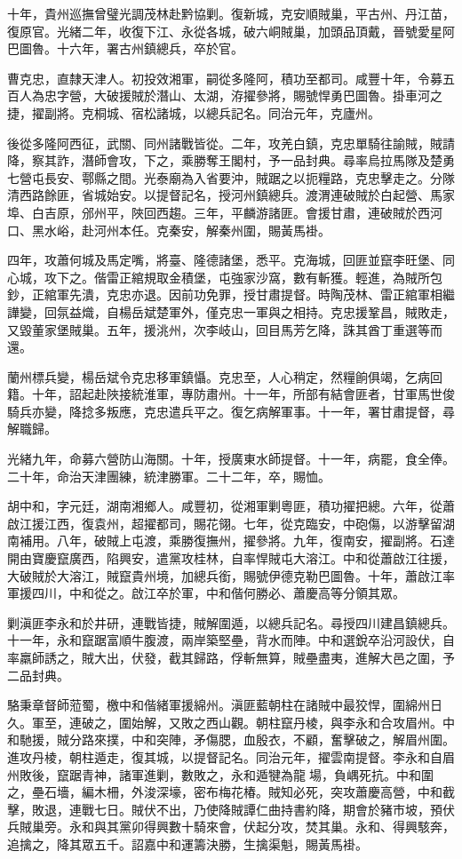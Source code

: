 \begin{pinyinscope}
十年，貴州巡撫曾璧光調茂林赴黔協剿。復新城，克安順賊巢，平古州、丹江苗，復原官。光緒二年，收復下江、永從各城，破六峒賊巢，加頭品頂戴，晉號愛星阿巴圖魯。十六年，署古州鎮總兵，卒於官。

曹克忠，直隸天津人。初投效湘軍，嗣從多隆阿，積功至都司。咸豐十年，令募五百人為忠字營，大破援賊於潛山、太湖，洊擢參將，賜號悍勇巴圖魯。掛車河之捷，擢副將。克桐城、宿松諸城，以總兵記名。同治元年，克廬州。

後從多隆阿西征，武關、同州諸戰皆從。二年，攻羌白鎮，克忠單騎往諭賊，賊請降，察其詐，潛師會攻，下之，乘勝奪王閣村，予一品封典。尋率烏拉馬隊及楚勇七營屯長安、鄠縣之間。光泰廟為入省要沖，賊踞之以扼糧路，克忠擊走之。分隊清西路餘匪，省城始安。以提督記名，授河州鎮總兵。渡渭連破賊於白起營、馬家埠、白吉原，邠州平，陜回西趨。三年，平麟游諸匪。會援甘肅，連破賊於西河口、黑水峪，赴河州本任。克秦安，解秦州圍，賜黃馬褂。

四年，攻蕭何城及馬定嘴，將臺、隆德諸堡，悉平。克海城，回匪並竄李旺堡、同心城，攻下之。偕雷正綰規取金積堡，屯強家沙窩，數有斬獲。輕進，為賊所包鈔，正綰軍先潰，克忠亦退。因前功免罪，授甘肅提督。時陶茂林、雷正綰軍相繼譁變，回氛益熾，自楊岳斌楚軍外，僅克忠一軍與之相持。克忠援鞏昌，賊敗走，又毀董家堡賊巢。五年，援洮州，次李岐山，回目馬芳乞降，誅其酋丁重選等而還。

蘭州標兵變，楊岳斌令克忠移軍鎮懾。克忠至，人心稍定，然糧餉俱竭，乞病回籍。十年，詔起赴陜接統淮軍，專防肅州。十一年，所部有結會匪者，甘軍馬世俊騎兵亦變，降捻多叛應，克忠遣兵平之。復乞病解軍事。十一年，署甘肅提督，尋解職歸。

光緒九年，命募六營防山海關。十年，授廣東水師提督。十一年，病罷，食全俸。二十年，命治天津團練，統津勝軍。二十二年，卒，賜恤。

胡中和，字元廷，湖南湘鄉人。咸豐初，從湘軍剿粵匪，積功擢把總。六年，從蕭啟江援江西，復袁州，超擢都司，賜花翎。七年，從克臨安，中砲傷，以游擊留湖南補用。八年，破賊上屯渡，乘勝復撫州，擢參將。九年，復南安，擢副將。石達開由寶慶竄廣西，陷興安，遣黨攻桂林，自率悍賊屯大溶江。中和從蕭啟江往援，大破賊於大溶江，賊竄貴州境，加總兵銜，賜號伊德克勒巴圖魯。十年，蕭啟江率軍援四川，中和從之。啟江卒於軍，中和偕何勝必、蕭慶高等分領其眾。

剿滇匪李永和於井研，連戰皆捷，賊解圍遁，以總兵記名。尋授四川建昌鎮總兵。十一年，永和竄踞富順牛腹渡，兩岸築堅壘，背水而陣。中和選銳卒沿河設伏，自率羸師誘之，賊大出，伏發，截其歸路，俘斬無算，賊壘盡夷，進解大邑之圍，予二品封典。

駱秉章督師蒞蜀，檄中和偕緒軍援綿州。滇匪藍朝柱在諸賊中最狡悍，圍綿州日久。軍至，連破之，圍始解，又敗之西山觀。朝柱竄丹棱，與李永和合攻眉州。中和馳援，賊分路來撲，中和突陣，矛傷腮，血殷衣，不顧，奮擊破之，解眉州圍。進攻丹棱，朝柱遁走，復其城，以提督記名。同治元年，擢雲南提督。李永和自眉州敗後，竄踞青神，諸軍進剿，數敗之，永和遁犍為龍場，負嵎死抗。中和圍之，壘石墻，編木柵，外浚深壕，密布梅花椿。賊知必死，突攻蕭慶高營，中和截擊，敗退，連戰七日。賊伏不出，乃使降賊譚仁曲持書約降，期會於豬市坡，預伏兵賊巢旁。永和與其黨卯得興數十騎來會，伏起分攻，焚其巢。永和、得興駭奔，追擒之，降其眾五千。詔嘉中和運籌決勝，生擒渠魁，賜黃馬褂。


\end{pinyinscope}
